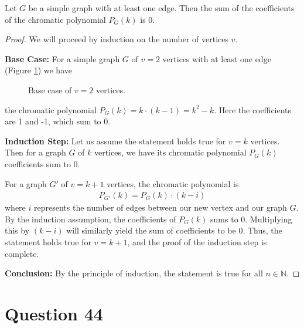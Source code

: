 \documentclass[11pt, oneside]{article}   	%
\begin{document}
Let $G$ be a simple graph with at least one edge. Then the sum of the coefficients of the chromatic polynomial $P_G(k)$ is 0.
\begin{proof}
We will proceed by induction on the number of vertices $v$.

\textbf{Base Case:} For a simple graph $G$ of $v=2$ vertices with at least one edge (Figure \ref{base case}) we have
\begin{figure}[h]           
            \centering
            \caption{Base case of $v=2$ vertices.}
            \label{base case}
\end{figure}

the chromatic polynomial $P_G(k) = k\cdot(k-1) = k^2-k$. Here the coefficients are 1 and -1, which sum to 0.

\textbf{Induction Step:} Let us assume the statement holds true for $v=k$ vertices. Then for a graph $G$ of $k$ vertices, we have its chromatic polynomial $P_G(k)$ coefficients sum to 0. 

For a graph $G'$ of $v=k+1$ vertices, the chromatic polynomial is
\begin{align*}
	P_{G'}(k) = P_G(k)\cdot (k-i)
\end{align*}
where $i$ represents the number of edges between our new vertex and our graph $G$. By the induction assumption, the coefficients of $P_G(k)$ sums to 0. Multiplying this by $(k-i)$ will similarly yield the sum of coefficients to be 0. Thus, the statement holds true for $v=k+1$, and the proof of the induction step is complete.

\textbf{Conclusion:} By the principle of induction,  the statement is true for all $n \in \mathbb{N}$.
\end{proof}

\section*{Question 44}
\end{document}
